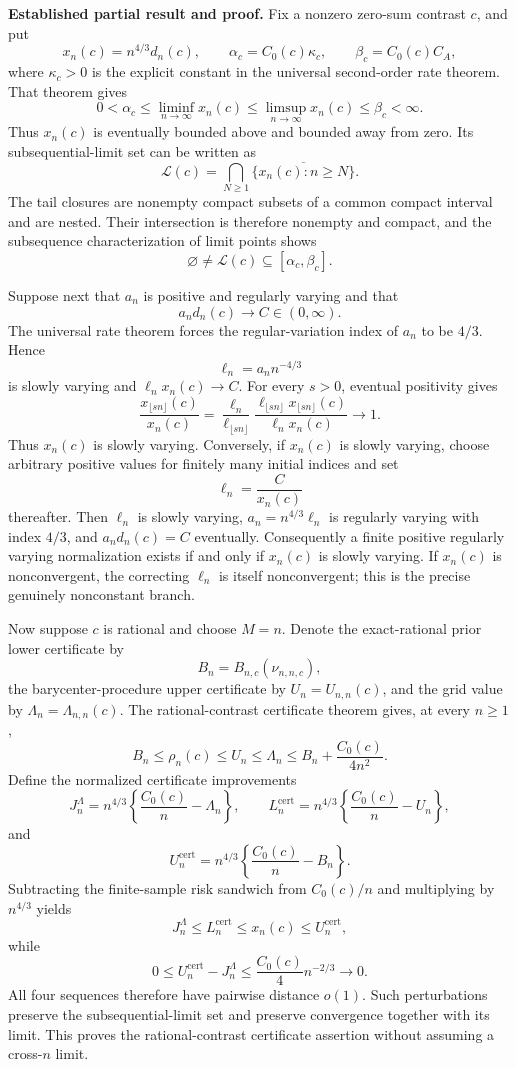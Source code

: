 \textbf{Established partial result and proof.}
Fix a nonzero zero-sum contrast \(c\), and put
\[
 x_n(c)=n^{4/3}d_n(c),\qquad
 \alpha_c=C_0(c)\kappa_c,\qquad
 \beta_c=C_0(c)C_A,
\]
where \(\kappa_c>0\) is the explicit constant in the universal second-order rate theorem. That theorem gives
\[
 0<\alpha_c\leq\liminf_{n\to\infty}x_n(c)
 \leq\limsup_{n\to\infty}x_n(c)
 \leq\beta_c<\infty.
\]
Thus \(x_n(c)\) is eventually bounded above and bounded away from zero. Its subsequential-limit set can be written as
\[
 \mathcal L(c)=\bigcap_{N\geq1}
 \overline{\{x_n(c):n\geq N\}}.
\]
The tail closures are nonempty compact subsets of a common compact interval and are nested. Their intersection is therefore nonempty and compact, and the subsequence characterization of limit points shows
\[
 \varnothing\neq\mathcal L(c)\subseteq[\alpha_c,\beta_c].
\]

Suppose next that \(a_n\) is positive and regularly varying and that
\[
 a_nd_n(c)\longrightarrow C\in(0,\infty).
\]
The universal rate theorem forces the regular-variation index of \(a_n\) to be \(4/3\). Hence
\[
 \ell_n=a_nn^{-4/3}
\]
is slowly varying and \(\ell_nx_n(c)\to C\). For every \(s>0\), eventual positivity gives
\[
 \frac{x_{\lfloor sn\rfloor}(c)}{x_n(c)}
 =\frac{\ell_n}{\ell_{\lfloor sn\rfloor}}
 \frac{\ell_{\lfloor sn\rfloor}x_{\lfloor sn\rfloor}(c)}
 {\ell_nx_n(c)}
 \longrightarrow1.
\]
Thus \(x_n(c)\) is slowly varying. Conversely, if \(x_n(c)\) is slowly varying, choose arbitrary positive values for finitely many initial indices and set
\[
 \ell_n=\frac{C}{x_n(c)}
\]
thereafter. Then \(\ell_n\) is slowly varying, \(a_n=n^{4/3}\ell_n\) is regularly varying with index \(4/3\), and \(a_nd_n(c)=C\) eventually. Consequently a finite positive regularly varying normalization exists if and only if \(x_n(c)\) is slowly varying. If \(x_n(c)\) is nonconvergent, the correcting \(\ell_n\) is itself nonconvergent; this is the precise genuinely nonconstant branch.

Now suppose \(c\) is rational and choose \(M=n\). Denote the exact-rational prior lower certificate by
\[
 B_n=B_{n,c}(\nu_{n,n,c}),
\]
the barycenter-procedure upper certificate by \(U_n=U_{n,n}(c)\), and the grid value by \(\Lambda_n=\Lambda_{n,n}(c)\). The rational-contrast certificate theorem gives, at every \(n\geq1\),
\[
 B_n\leq\rho_n(c)\leq U_n\leq\Lambda_n
 \leq B_n+\frac{C_0(c)}{4n^2}.
\]
Define the normalized certificate improvements
\[
 J_n^\Lambda=n^{4/3}\left\{\frac{C_0(c)}n-\Lambda_n\right\},
 \qquad
 L_n^{\mathrm{cert}}=n^{4/3}\left\{\frac{C_0(c)}n-U_n\right\},
\]
and
\[
 U_n^{\mathrm{cert}}=n^{4/3}\left\{\frac{C_0(c)}n-B_n\right\}.
\]
Subtracting the finite-sample risk sandwich from \(C_0(c)/n\) and multiplying by \(n^{4/3}\) yields
\[
 J_n^\Lambda\leq L_n^{\mathrm{cert}}
 \leq x_n(c)\leq U_n^{\mathrm{cert}},
\]
while
\[
 0\leq U_n^{\mathrm{cert}}-J_n^\Lambda
 \leq\frac{C_0(c)}4n^{-2/3}\longrightarrow0.
\]
All four sequences therefore have pairwise distance \(o(1)\). Such perturbations preserve the subsequential-limit set and preserve convergence together with its limit. This proves the rational-contrast certificate assertion without assuming a cross-\(n\) limit.

